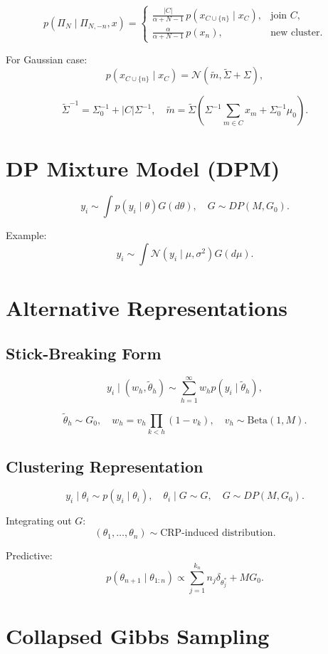 \documentclass[12pt,oneside]{book}
\numberwithin{equation}{section}
\theoremstyle{definition}
\theoremstyle{plain}
\theoremstyle{remark}
\begin{document}
\[
p(\Pi_N \mid \Pi_{N,-n}, x)
=
\begin{cases}
\frac{|C|}{\alpha+N-1}\, p(x_{C \cup \{n\}} \mid x_C), & \text{join } C, \\
\frac{\alpha}{\alpha+N-1}\, p(x_n), & \text{new cluster}.
\end{cases}
\]

For Gaussian case:
\[
p(x_{C \cup \{n\}} \mid x_C)
=
\mathcal{N}(\tilde m,\tilde \Sigma + \Sigma),
\]

\[
\tilde \Sigma^{-1} = \Sigma_0^{-1} + |C|\Sigma^{-1},
\quad
\tilde m = \tilde \Sigma\left(\Sigma^{-1}\sum_{m\in C} x_m + \Sigma_0^{-1}\mu_0\right).
\]

\section{DP Mixture Model (DPM)}

\[
y_i \sim \int p(y_i \mid \theta) G(d\theta),
\quad
G \sim DP(M,G_0).
\]

Example:
\[
y_i \sim \int \mathcal{N}(y_i \mid \mu,\sigma^2) G(d\mu).
\]

\section{Alternative Representations}

\subsection{Stick-Breaking Form}

\[
y_i \mid (w_h,\tilde\theta_h)
\sim
\sum_{h=1}^{\infty} w_h p(y_i \mid \tilde\theta_h),
\]

\[
\tilde\theta_h \sim G_0,
\quad
w_h = v_h \prod_{k<h}(1-v_k),
\quad
v_h \sim \mathrm{Beta}(1,M).
\]

\subsection{Clustering Representation}

\[
y_i \mid \theta_i \sim p(y_i \mid \theta_i),
\quad
\theta_i \mid G \sim G,
\quad
G \sim DP(M,G_0).
\]

Integrating out $G$:
\[
(\theta_1,\dots,\theta_n) \sim \text{CRP-induced distribution}.
\]

Predictive:
\[
p(\theta_{n+1} \mid \theta_{1:n})
\propto
\sum_{j=1}^{k_n} n_j \delta_{\theta_j^*} + M G_0.
\]

\section{Collapsed Gibbs Sampling}
\end{document}
